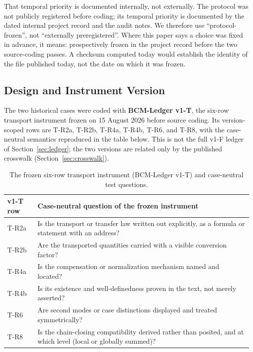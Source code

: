 \documentclass[11pt,a4paper]{article}
\begin{document}
That temporal priority is documented internally, not externally. The protocol
was not publicly registered before coding; its temporal priority is documented
by the dated internal project record and the audit notes. We therefore use
``protocol-frozen'', not ``externally preregistered''. Where this paper says a
choice was fixed in advance, it means: prospectively frozen in the project
record before the two source-coding passes. A checksum computed today would
establish the identity of the file published today, not the date on which it
was frozen.

\subsection{Design and Instrument Version}

The two historical cases were coded with \textbf{BCM-Ledger v1-T}, the six-row
transport instrument frozen on 15 August 2026 before source coding. Its
version-scoped rows are T-R2a, T-R2b, T-R4a, T-R4b, T-R6, and T-R8, with the
case-neutral semantics reproduced in the table below. This is not the full v1-F
ledger of Section~\ref{sec:ledger}; the two versions are related only by the
published crosswalk (Section~\ref{sec:crosswalk}).

\begin{table}[htbp]
\centering
\small
\caption{The frozen six-row transport instrument (BCM-Ledger v1-T) and case-neutral test questions.}
\label{tab:frozen_instrument_v1t}
\begin{tabularx}{\textwidth}{@{}l X@{}}
\toprule
v1-T row & Case-neutral question of the frozen instrument \\
\midrule
T-R2a & Is the transport or transfer law written out explicitly, as a formula
        or statement with an address? \\
\addlinespace[3pt]
T-R2b & Are the transported quantities carried with a visible conversion
        factor? \\
\addlinespace[3pt]
T-R4a & Is the compensation or normalization mechanism named and located? \\
\addlinespace[3pt]
T-R4b & Is its existence and well-definedness proven in the text, not merely
        asserted? \\
\addlinespace[3pt]
T-R6 & Are second modes or case distinctions displayed and treated
       symmetrically? \\
\addlinespace[3pt]
T-R8 & Is the chain-closing compatibility derived rather than posited, and at
       which level (local or globally summed)? \\
\bottomrule
\end{tabularx}
\end{table}
\end{document}

